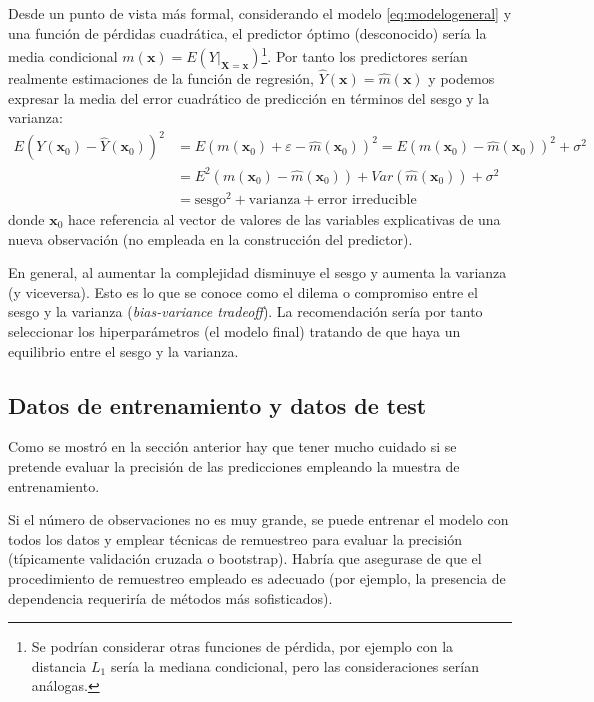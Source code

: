 \documentclass[
]{book}
\theoremstyle{break}
\theoremstyle{definition}
\theoremstyle{definition}
\theoremstyle{definition}
\theoremstyle{remark}
\begin{document}
Desde un punto de vista más formal, considerando el modelo \eqref{eq:modelogeneral} y una función de pérdidas cuadrática, el predictor óptimo (desconocido) sería la media condicional \(m(\mathbf{x}) = E\left( \left. Y\right\vert_{\mathbf{X}=\mathbf{x}} \right)\)\footnote{Se podrían considerar otras funciones de pérdida, por ejemplo con la distancia \(L_1\) sería la mediana condicional, pero las consideraciones serían análogas.}.
Por tanto los predictores serían realmente estimaciones de la función de regresión, \(\hat Y(\mathbf{x}) = \hat m(\mathbf{x})\) y podemos expresar la media del error cuadrático de predicción en términos del sesgo y la varianza:
\[
\begin{aligned}
E \left( Y(\mathbf{x}_0) - \hat Y(\mathbf{x}_0) \right)^2 & = E \left( m(\mathbf{x}_0) + \varepsilon - \hat m(\mathbf{x}_0) \right)^2 = E \left( m(\mathbf{x}_0) - \hat m(\mathbf{x}_0) \right)^2 + \sigma^2 \\
& = E^2 \left( m(\mathbf{x}_0) - \hat m(\mathbf{x}_0) \right) + Var\left( \hat m(\mathbf{x}_0) \right) + \sigma^2 \\
& = \text{sesgo}^2 + \text{varianza} + \text{error irreducible}
\end{aligned}
\]
donde \(\mathbf{x}_0\) hace referencia al vector de valores de las variables explicativas de una nueva observación (no empleada en la construcción del predictor).

En general, al aumentar la complejidad disminuye el sesgo y aumenta la varianza (y viceversa).
Esto es lo que se conoce como el dilema o compromiso entre el sesgo y la varianza (\emph{bias-variance tradeoff}).
La recomendación sería por tanto seleccionar los hiperparámetros (el modelo final) tratando de que haya un equilibrio entre el sesgo y la varianza.

\hypertarget{entrenamiento-test}{%
\subsection{Datos de entrenamiento y datos de test}\label{entrenamiento-test}}

Como se mostró en la sección anterior hay que tener mucho cuidado si se pretende evaluar la precisión de las predicciones empleando la muestra de entrenamiento.

Si el número de observaciones no es muy grande, se puede entrenar el modelo con todos los datos y emplear técnicas de remuestreo para evaluar la precisión (típicamente validación cruzada o bootstrap).
Habría que asegurase de que el procedimiento de remuestreo empleado es adecuado (por ejemplo, la presencia de dependencia requeriría de métodos más sofisticados).
\end{document}
